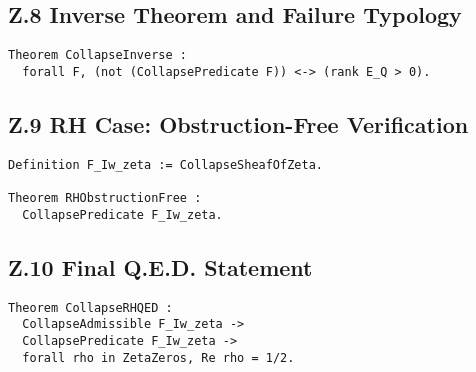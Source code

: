 \documentclass[11pt]{article}
\begin{document}
\subsection*{Z.8 Inverse Theorem and Failure Typology}

\begin{lstlisting}[language=Coq, caption=Failure ⇔ rank > 0, captionpos=b]
Theorem CollapseInverse :
  forall F, (not (CollapsePredicate F)) <-> (rank E_Q > 0).
\end{lstlisting}

\subsection*{Z.9 RH Case: Obstruction-Free Verification}

\begin{lstlisting}[language=Coq, caption=RH Case, captionpos=b]
Definition F_Iw_zeta := CollapseSheafOfZeta.

Theorem RHObstructionFree :
  CollapsePredicate F_Iw_zeta.
\end{lstlisting}

\subsection*{Z.10 Final Q.E.D. Statement}

\begin{lstlisting}[language=Coq, caption=Collapse Q.E.D. for RH, captionpos=b]
Theorem CollapseRHQED :
  CollapseAdmissible F_Iw_zeta ->
  CollapsePredicate F_Iw_zeta ->
  forall rho in ZetaZeros, Re rho = 1/2.
\end{lstlisting}
\end{document}
